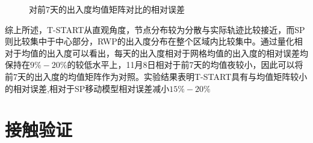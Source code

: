 \begin{figure}[ht]
\centering
{}
\caption{对前7天的出入度均值矩阵对比的相对误差}\label{figure_relative_err}
\end{figure}

综上所述，T-START从直观角度，节点分布较为分散与实际轨迹比较接近，而SP则比较集中于中心部分，RWP的出入度分布在整个区域内比较集中。通过量化相对于均值的出入度可以看出，每天的出入度相对于网格均值的出入度的相对误差均保持在$9\%-20\%$的较低水平上，11月8日相对于前7天的均值夜较小，因此可以将前7天的出入度的均值矩阵作为对照。实验结果表明T-START具有与均值矩阵较小的相对误差,相对于SP移动模型相对误差减小$15\%-20\%$
\section{接触验证}

